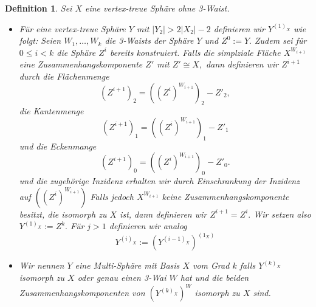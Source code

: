 \documentclass[12pt,titlepage,twoside,cleardoublepage]{article}
\theoremstyle{nummermitklammern}
\newtheorem{definition}[temp]{Definition}
\newtheorem{definition}[zahl]{Definition}
\numberwithin{equation}{section}
\begin{document}
\begin{definition}
Sei $X$ eine vertex-treue Sphäre ohne 3-Waist.
\begin{itemize}
\item Für eine vertex-treue Sphäre $Y$ mit $\vert Y_2 \vert > 2\vert X_2 \vert-2$ definieren wir $Y^{(1)_X}$ wie folgt:
Seien $W_1,\ldots,W_k$ die 3-Waists der Sphäre $Y$ und $Z^0:=Y.$ 
Zudem sei für $0\leq i < k$ die Sphäre $Z^i$ bereits konstruiert.
Falls die simplziale Fläche $X^{W_{i+1}}$ eine Zusammenhangskomponente $Z'$ mit $Z'\cong X,$ dann definieren wir $Z^{i+1}$ durch die Flächenmenge 
\[
(Z^{i+1})_2=((Z^{i})^{W_{i+1}})_2-Z'_2,
\]
die Kantenmenge
\[
(Z^{i+1})_1=((Z^{i})^{W_{i+1}})_1-Z'_1
\]
und die Eckenmange 
\[
(Z^{i+1})_0=((Z^{i})^{W_{i+1}})_0-Z'_0.
\]
und die zugehörige Inzidenz erhalten wir durch Einschrankung der Inzidenz auf $((Z^{i})^{W_{i+1}})$
Falls jedoch $X^{W_{i+1}}$ keine Zusammenhangskomponente besitzt, die isomorph zu $X$ ist, dann definieren wir $Z^{i+1}=Z^i.$ Wir setzen also $Y^{(1)_X}:=Z^k.$ 
Für $j>1$ definieren wir analog 
\[
Y^{(i)_X}:={(Y^{(i-1)_X})}^{(1_X)}
\]
\item Wir nennen $Y$ eine Multi-Sphäre mit Basis $X$ vom Grad $k$ falls $Y^{(k)_X}$ isomorph zu $X$ oder genau einen 3-Wai $W$ hat und die beiden Zusammenhangskomponenten von $(Y^{(k)_X})^W$ isomorph zu $X$ sind.
\end{itemize}
\end{definition}
\end{document}
